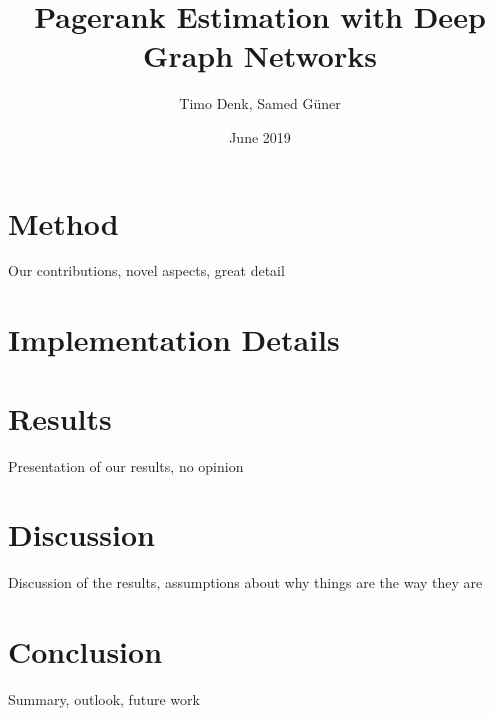 \documentclass{article}
\title{Pagerank Estimation with Deep Graph Networks}
\author{Timo Denk, Samed Güner}
\date{June 2019}
\begin{document}
\maketitle

\tableofcontents
\listoffigures

\newpage


\newpage


\newpage
\section{Method}
Our contributions, novel aspects, great detail

\newpage


\newpage
\section{Implementation Details}


\newpage
\section{Results}
Presentation of our results, no opinion

\newpage
\section{Discussion}
Discussion of the results, assumptions about why things are the way they are

\newpage
\section{Conclusion}
Summary, outlook, future work

\newpage
\appendix


\newpage
\printbibliography
{}
\label{sec:references}
\end{document}

